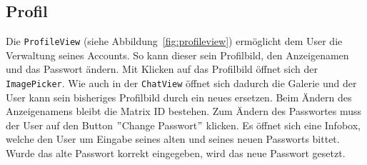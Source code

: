     \newpage
    \subsection{Profil}\label{subsec:profile}
    Die \texttt{ProfileView} (siehe Abbildung~\ref{fig:profileview}) ermöglicht dem User die Verwaltung seines Accounts.
    So kann dieser sein Profilbild, den Anzeigenamen und das Passwort ändern.
    Mit Klicken auf das Profilbild öffnet sich der \texttt{ImagePicker}.
    Wie auch in der \texttt{ChatView} öffnet sich dadurch die Galerie und der User kann sein bisheriges Profilbild durch ein neues ersetzen.
    Beim Ändern des Anzeigenamens bleibt die Matrix ID bestehen.
    Zum Ändern des Passwortes muss der User auf den Button \("\)Change Passwort\("\) klicken.
    Es öffnet sich eine Infobox, welche den User um Eingabe seines alten und seines neuen Passworts bittet.
    Wurde das alte Passwort korrekt eingegeben, wird das neue Passwort gesetzt.\\

